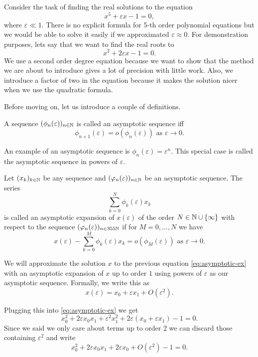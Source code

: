 Consider the task of finding the real solutions to the equation
\[
x^5 + \varepsilon x - 1 = 0,
\]
where $\varepsilon \ll 1$. There is no explicit formula for 5-th order
polynomial equations but we would be able to solve it easily if we approximated
$\varepsilon \approx 0$. For demonstration purposes, lets say that we want to
find the real roots to
\[
  \label{eq:asymptotic-ex}
  x^2 + 2\varepsilon x  - 1 = 0.
\]
We use a second order degree equation because we want to show that the method
we are about to introduce gives a lot of precision with little work. Also, we
introduce a factor of two in the equation because it makes the solution nicer
when we use the quadratic formula.

Before moving on, let us introduce a couple of definitions.


\begin{dfn}

  A sequence $(\phi_n(\varepsilon))_{n\in \mathbb{N}}$ is called an asymptotic sequence
  iff
  \[
    \phi_{n + 1}(\varepsilon) = o(\phi_n(\varepsilon)) \text{ as } \varepsilon \to 0.
  \]
\end{dfn}

An example of an asymptotic sequence is $\phi_n(\varepsilon) = \varepsilon^n$.
This special case is called the asymptotic sequence in powers of $\varepsilon$.

\begin{dfn}

  Let $(x_k)_{k \in \mathbb{N}}$ be any sequence and $(\varphi_n(\varepsilon))_{n\in
  \mathbb{N}}$ be an asymptotic sequence. The series
  \[
    \sum_{k = 0}^N \phi_k (\varepsilon) x_k
  \]
  is called an asymptotic expansion of $x(\varepsilon)$ of the order $N \in \mathbb{N}
  \cup \{ \infty \}$ with respect to the sequence
  $(\varphi_n(\varepsilon))_{n\in
  355   \mathbb{N}}$ if for $M = 0, \dots, N$ we have
  \[
    x(\varepsilon)  - \sum_{k = 0}^M \phi_k(\varepsilon) x_k
    = o(\phi_M(\varepsilon)) \text{ as } \varepsilon \to 0.
  \]
\end{dfn}

We will approximate the solution $x$ to the previous equation
\eqref{eq:asymptotic-ex} with an asymptotic expansion of $x$ up to order $1$
using powers of $\varepsilon$ as our asymptotic sequence. Formally, we write
this as
\[
  x(\varepsilon) = x_0  + \varepsilon x_1 + O(\varepsilon^2).
\]

Plugging this into \eqref{eq:asymptotic-ex} we get
\[
  x_0^2 + 2\varepsilon x_0 x_1 + \varepsilon^2 x_1^2 +
  2 \varepsilon (x_0 + \varepsilon x_1) - 1 = 0.
\]
Since we said we only care about terms up to order 2 we can discard those
containing $\varepsilon^2$ and write
\[
  x_0^2 + 2\varepsilon x_0 x_1 + 2\varepsilon x_0 + O(\varepsilon^2) - 1 = 0.
\]






